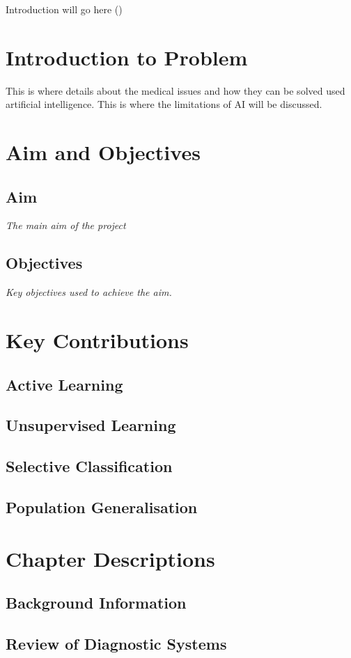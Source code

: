 Introduction will go here (\cite{carse2019active})

\section{Introduction to Problem}
\label{sec:intoduction_to_problem}
This is where details about the medical issues and how they can be solved used artificial intelligence. This is where the limitations of AI will be discussed.

\section{Aim and Objectives}
\label{sec:aim_and_objectives}

\subsection{Aim}
\label{subsec:aim}
\textit{The main aim of the project}

\subsection{Objectives}
\label{subsec:objectives}
\textit{Key objectives used to achieve the aim.}

\section{Key Contributions}
\label{sec:contributions}

\subsection{Active Learning}
\label{subsec:active_learning}

\subsection{Unsupervised Learning}
\label{subsec:unsupervised_learning}

\subsection{Selective Classification}
\label{subsec:selective_classification}

\subsection{Population Generalisation}
\label{subsec:population_generalisation}

\section{Chapter Descriptions}
\label{sec:chapter_descriptions}

\subsection*{Background Information}

\subsection*{Review of Diagnostic Systems}

